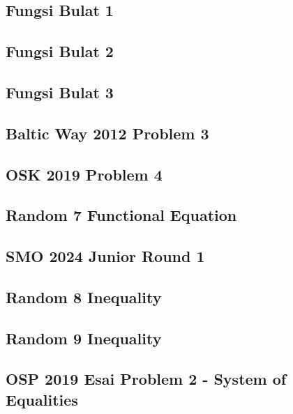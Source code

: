 \subsection{Fungsi Bulat 1}

\newpage

\subsection{Fungsi Bulat 2}

\newpage

\subsection{Fungsi Bulat 3}

\newpage

\subsection{Baltic Way 2012 Problem 3}

\newpage

\subsection{OSK 2019 Problem 4}

\newpage

\subsection{Random 7 Functional Equation}

\newpage

\subsection{SMO 2024 Junior Round 1}

\newpage

\subsection{Random 8 Inequality}

\newpage

\subsection{Random 9 Inequality}

\newpage

\subsection{OSP 2019 Esai Problem 2 - System of Equalities}

\newpage

